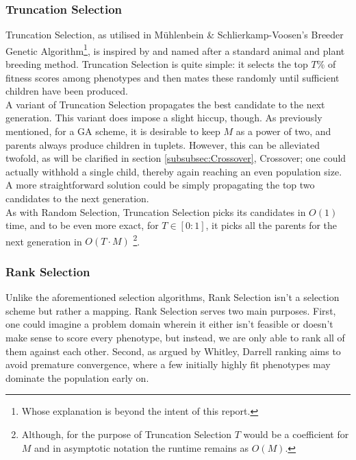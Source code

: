 \subsubsection{Truncation Selection}
Truncation Selection\cite{Wiki-truncation-selection}, as utilised in Mühlenbein \& Schlierkamp-Voosen's\cite{Truncation-Selection-Breeder-Algorithm} Breeder Genetic Algorithm\footnote{Whose explanation is beyond the intent of this report.}, is inspired by and named after a standard animal and plant breeding method. Truncation Selection is quite simple: it selects the top $T\%$ of fitness scores among phenotypes and then mates these randomly until sufficient children have been produced.
\\
A variant of Truncation Selection propagates the best candidate to the next generation. This variant does impose a slight hiccup, though. As previously mentioned, for a GA scheme, it is desirable to keep $M$ as a power of two, and parents always produce children in tuplets. However, this can be alleviated twofold, as will be clarified in section \ref{subsubsec:Crossover}, Crossover; one could actually withhold a single child, thereby again reaching an even population size. A more straightforward solution could be simply propagating the top two candidates to the next generation.
\\
As with Random Selection, Truncation Selection picks its candidates in $O(1)$ time, and to be even more exact, for $T \in [0:1]$, it picks all the parents for the next generation in $O(T \cdot M)$ \footnote{Although, for the purpose of Truncation Selection $T$ would be a coefficient for $M$ and in asymptotic notation the runtime remains as $O(M)$.}.

\subsubsection{Rank Selection}
Unlike the aforementioned selection algorithms, Rank Selection isn't a selection scheme but rather a mapping. Rank Selection serves two main purposes. First, one could imagine a problem domain wherein it either isn't feasible or doesn't make sense to score every phenotype, but instead, we are only able to rank all of them against each other. Second, as argued by Whitley, Darrell\cite{Rank-Selection-Usefullness} ranking aims to avoid premature convergence, where a few initially highly fit phenotypes may dominate the population early on.
\\


